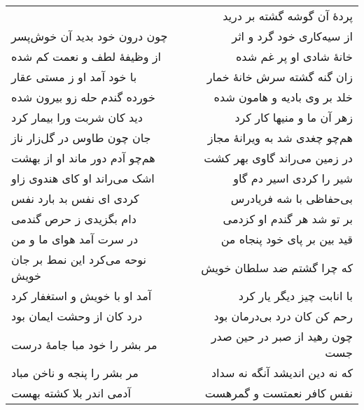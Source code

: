 \begin{center}
\begin{longtable}{l p{0.5cm} r}
&&
پردهٔ آن گوشه گشته بر درید
\\
چون درون خود بدید آن خوش‌پسر
&&
از سیه‌کاری خود گرد و اثر
\\
از وظیفهٔ لطف و نعمت کم شده
&&
خانهٔ شادی او پر غم شده
\\
با خود آمد او ز مستی عقار
&&
زان گنه گشته سرش خانهٔ خمار
\\
خورده گندم حله زو بیرون شده
&&
خلد بر وی بادیه و هامون شده
\\
دید کان شربت ورا بیمار کرد
&&
زهر آن ما و منیها کار کرد
\\
جان چون طاوس در گل‌زار ناز
&&
هم‌چو چغدی شد به ویرانهٔ مجاز
\\
هم‌چو آدم دور ماند او از بهشت
&&
در زمین می‌راند گاوی بهر کشت
\\
اشک می‌راند او کای هندوی زاو
&&
شیر را کردی اسیر دم گاو
\\
کردی ای نفس بد بارد نفس
&&
بی‌حفاظی با شه فریادرس
\\
دام بگزیدی ز حرص گندمی
&&
بر تو شد هر گندم او کزدمی
\\
در سرت آمد هوای ما و من
&&
قید بین بر پای خود پنجاه من
\\
نوحه می‌کرد این نمط بر جان خویش
&&
که چرا گشتم ضد سلطان خویش
\\
آمد او با خویش و استغفار کرد
&&
با انابت چیز دیگر یار کرد
\\
درد کان از وحشت ایمان بود
&&
رحم کن کان درد بی‌درمان بود
\\
مر بشر را خود مبا جامهٔ درست
&&
چون رهید از صبر در حین صدر جست
\\
مر بشر را پنجه و ناخن مباد
&&
که نه دین اندیشد آنگه نه سداد
\\
آدمی اندر بلا کشته بهست
&&
نفس کافر نعمتست و گمرهست
\\
\end{longtable}
\end{center}

